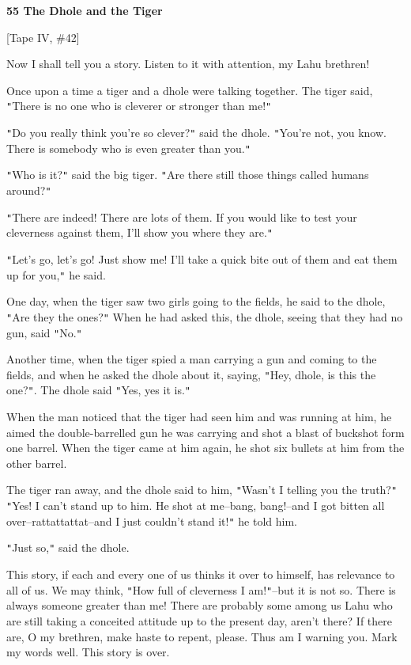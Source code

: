 
\textbf{55 The Dhole and the Tiger}

[Tape IV, \#42]

Now I shall tell you a story. Listen to it with attention, my Lahu brethren!

Once upon a time a tiger and a dhole were talking together. The tiger said, \texttt{"}There
is no one who is cleverer or stronger than me!\texttt{"}

\texttt{"}Do you really think you're so clever?\texttt{"} said the dhole. \texttt{"}You're
not, you know. There is somebody who is even greater than you.\texttt{"}

\texttt{"}Who is it?\texttt{"} said the big tiger. \texttt{"}Are there still those
things called humans around?\texttt{"}

\texttt{"}There are indeed! There are lots of them. If you would like to test your
cleverness against them, I'll show you where they are.\texttt{"}

\texttt{"}Let's go, let's go! Just show me! I'll take a quick bite out of them
and eat them up for you,\texttt{"} he said.

One day, when the tiger saw two girls going to the fields, he said to the dhole,
\texttt{"}Are they the ones?\texttt{"} When he had asked this, the dhole, seeing
that they had no gun, said \texttt{"}No.\texttt{"}

Another time, when the tiger spied a man carrying a gun and coming to the fields,
and when he asked the dhole about it, saying, \texttt{"}Hey, dhole, is this the
one?\texttt{"}. The dhole said \texttt{"}Yes, yes it is.\texttt{"}

When the man noticed that the tiger had seen him and was running at him, he aimed
the double-barrelled gun he was carrying and shot a blast of buckshot form one
barrel. When the tiger came at him again, he shot six bullets at him from the other
barrel.

The tiger ran away, and the dhole said to him, \texttt{"}Wasn't I telling you the
truth?\texttt{"} \texttt{"}Yes! I can't stand up to him. He shot at me--bang, bang!--and
I got bitten all over--rattattattat--and I just couldn't stand it!\texttt{"} he
told him.

\texttt{"}Just so,\texttt{"} said the dhole.

This story, if each and every one of us thinks it over to himself, has relevance
to all of us. We may think, \texttt{"}How full of cleverness I am!\texttt{"}--but
it is not so. There is always someone greater than me! There are probably some
among us Lahu who are still taking a conceited attitude up to the present day,
aren't there? If there are, O my brethren, make haste to repent, please. Thus am
I warning you. Mark my words well. This story is over.


